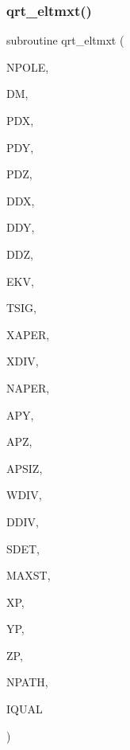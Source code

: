 \subsubsection{\texorpdfstring{qrt\+\_\+eltmxt()}{qrt\_eltmxt()}}
{\footnotesize\ttfamily subroutine qrt\+\_\+eltmxt (\begin{DoxyParamCaption}\item[{integer}]{N\+P\+O\+LE,  }\item[{double precision, dimension(npole)}]{DM,  }\item[{double precision, dimension(npole)}]{P\+DX,  }\item[{double precision, dimension(npole)}]{P\+DY,  }\item[{double precision, dimension(npole)}]{P\+DZ,  }\item[{double precision, dimension(npole)}]{D\+DX,  }\item[{double precision, dimension(npole)}]{D\+DY,  }\item[{double precision, dimension(npole)}]{D\+DZ,  }\item[{double precision}]{E\+KV,  }\item[{double precision}]{T\+S\+IG,  }\item[{double precision}]{X\+A\+P\+ER,  }\item[{double precision}]{X\+D\+IV,  }\item[{integer}]{N\+A\+P\+ER,  }\item[{double precision, dimension(naper)}]{A\+PY,  }\item[{double precision, dimension(naper)}]{A\+PZ,  }\item[{double precision}]{A\+P\+S\+IZ,  }\item[{double precision}]{W\+D\+IV,  }\item[{double precision}]{D\+D\+IV,  }\item[{double precision}]{S\+D\+ET,  }\item[{integer}]{M\+A\+X\+ST,  }\item[{double precision, dimension(maxst)}]{XP,  }\item[{double precision, dimension(maxst)}]{YP,  }\item[{double precision, dimension(maxst)}]{ZP,  }\item[{integer}]{N\+P\+A\+TH,  }\item[{integer}]{I\+Q\+U\+AL }\end{DoxyParamCaption})}

